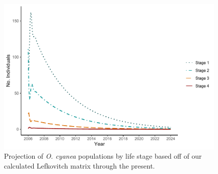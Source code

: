 \documentclass[
]{article}
\begin{document}
\begin{figure}
\centering
\includegraphics{Wulfing_Thesis_files/figure-latex/projection-1.pdf}
\caption{\label{fig:projection}Projection of \emph{O. cyanea} populations by life stage based off of our calculated Lefkovitch matrix through the present. \label{projection}}
\end{figure}

\begin{table}

\caption{\label{tab:lifetable}Stable stage distribution and reproductive value of each stage of the blue octopus population matrix given in Figure \ref{WriteMtxRounded}. The survivability (i.e.~the proportion of individuals who survive from stage i to stage i+1) from each stage includes death rate from fishing. Stages 1-4 survivability were calculated by summing up the proportion of individuals surviving and staying within a stage every month (\(P_i\)) and the proportion of individuals surviving and growing every month (\(G_i\)). Larval survivability of 0.0001328 was calculated by dividing the estimated number of larvae surviving back to stage 1 (\(F_4\)) by the average estimated reproductive output of \emph{O. cyanea}. \label{lifetable}}
\centering
{}
\end{table}
\end{document}
